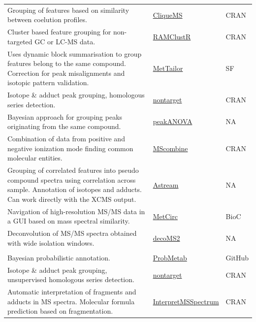 \documentclass[]{article}
\begin{document}
\begin{longtable}{>{\raggedright\arraybackslash}p{30em}>{\raggedright\arraybackslash}p{10em}>{\raggedright\arraybackslash}p{3em}}
\rowcolor{gray!6}  Grouping of features based on similarity between coelution profiles. & \href{https://cran.r-project.org/web/packages/cliqueMS/}{CliqueMS} & CRAN\\
Cluster based feature grouping for non-targeted GC or LC-MS data. & \href{https://github.com/cbroeckl/RAMClustR}{RAMClustR} & CRAN\\
\rowcolor{gray!6}  Uses dynamic block summarisation to group features belong to the same compound. Correction for peak misalignments and isotopic pattern validation. & \href{https://sourceforge.net/projects/mettailor/}{MetTailor} & SF\\
Isotope {\&} adduct peak grouping, homologous series detection. & \href{https://cran.r-project.org/web/packages/nontarget/}{nontarget} & CRAN\\
\rowcolor{gray!6}  Bayesian approach for grouping peaks originating from the same compound. & \href{http://research.cs.aalto.fi/pml/software/peakANOVA/}{peakANOVA} & NA\\
Combination of data from positive and negative ionization mode finding common molecular entities. & \href{https://cran.r-project.org/package=MScombine}{MScombine} & CRAN\\
\rowcolor{gray!6}  Grouping of correlated features into pseudo compound spectra using correlation across sample. Annotation of isotopes and adducts. Can work directly with the XCMS output. & \href{http://www.urr.cat/AStream/AStream.html}{Astream} & NA\\
Navigation of high-resolution MS/MS data in a GUI based on mass spectral similarity. & \href{https://bioconductor.org/packages/release/bioc/html/MetCirc.html}{MetCirc} & BioC\\
\rowcolor{gray!6}  Deconvolution of MS/MS spectra obtained with wide isolation windows. & \href{http://pattilab.wustl.edu/software/decoms2/decoms2.php}{decoMS2} & NA\\
\addlinespace[0.3em]
\multicolumn{3}{l}{\textbf{Ion/adduct/fragment annotation}}\\
Bayesian probabilistic annotation. & \href{https://github.com/rsilvabioinfo/ProbMetab}{ProbMetab} & GitHub\\
\rowcolor{gray!6}  Isotope {\&} adduct peak grouping, unsupervised homologous series detection. & \href{https://cran.r-project.org/web/packages/nontarget/}{nontarget} & CRAN\\
Automatic interpretation of fragments and adducts in MS spectra. Molecular formula prediction based on fragmentation. & \href{https://cran.r-project.org/package=InterpretMSSpectrum}{InterpretMSSpectrum} & CRAN\\

\end{longtable}
\end{document}
